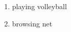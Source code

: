 \documentclass{article}
\begin{document}
\section{{\color{red}{HOBBIES}}}
\begin{enumerate}
    \item playing volleyball
    \item browsing net
\end{enumerate}
\end{document}
